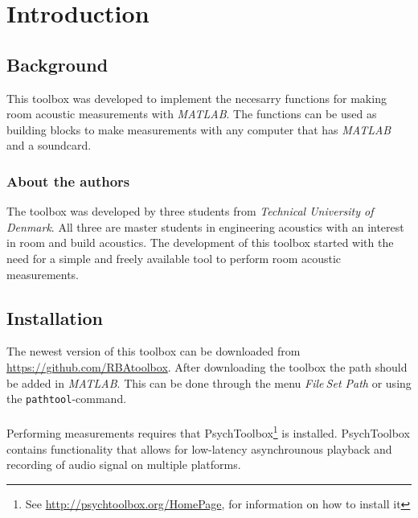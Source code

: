 
\chapter{Introduction} %
\label{cha:introduction}

\section{Background} %
\label{sec:background}
This toolbox was developed to implement the necesarry functions for making room acoustic measurements with \emph{MATLAB}. The functions can be used as building blocks to make measurements with any computer that has \emph{MATLAB} and a soundcard.\\

\subsection{About the authors} %
\label{sub:about_the_authors}
The toolbox was developed by three students from \emph{Technical University of Denmark}. All three are master students in engineering acoustics with an interest in room and build acoustics. The development of this toolbox started with the need for a simple and freely available tool to perform room acoustic measurements.



\section{Installation} %
\label{sec:installation}
The newest version of this toolbox can be downloaded from \url{https://github.com/RBAtoolbox}. After downloading the toolbox the path should be added in \emph{MATLAB}. This can be done through the menu \emph{File$\>$Set Path} or using the \texttt{pathtool}-command.\\
\\
Performing measurements requires that PsychToolbox\footnote{See \url{http://psychtoolbox.org/HomePage}, for information on how to install it} is installed. PsychToolbox contains functionality that allows for low-latency asynchrounous playback and recording of audio signal on multiple platforms.



